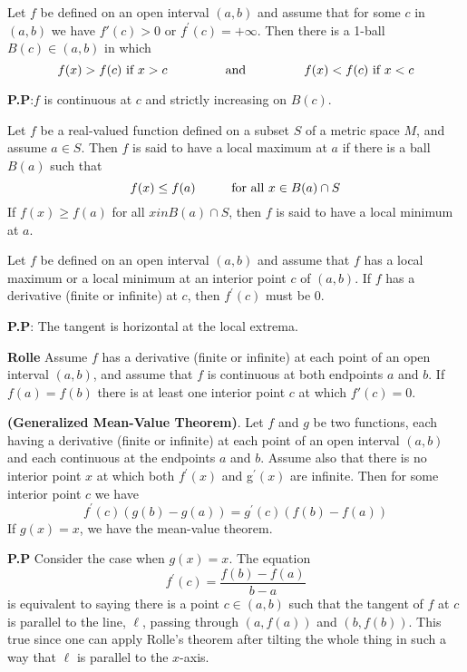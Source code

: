 \documentclass[10pt,a4paper]{book}
\begin{document}
\begin{Thm}
Let $f$ be defined on an open interval $(a, b)$ and assume that for some $c$ in $(a, b)$ we have $f\prime(c) > 0$ or $f^\prime(c) = +\infty$. Then there is a 1-ball $B(c) \in (a,b)$ in which 
$$f(x) > f(c) \text{ if } x > c \hspace*{1.5cm} \text{ and }\hspace*{1.5cm} f(x) < f(c) \text{ if } x < c  $$
\end{Thm}
\noindent \textbf{P.P}:$f$ is continuous at $c$ and strictly increasing on $B(c)$. 


\begin{deff}
Let $f$ be a real-valued function defined on a subset $S$ of a metric space $M$, and assume $a \in S$. Then $f$ is said to have a local maximum at $a$ if there is a ball $B(a)$ such that 
$$f(x)\leq f(a) \hspace*{1cm} \text{for all } x \in B(a)\cap S$$
If $f(x) \geq f(a)$ for all $x in B(a) \cap S$, then $f$ is said to have a local minimum at $a$.
\end{deff}

\begin{Thm}
 Let $f$ be defined on an open interval $(a, b)$ and assume that $f$ has a local maximum or a local minimum at an interior point $c$ of $(a, b)$. If $f$ has a derivative (finite or infinite) at $c$, then $f^\prime(c)$ must be $0$.

\end{Thm}
\noindent \textbf{P.P}: The tangent is horizontal at the local extrema.


\begin{Thm}\textbf{Rolle}
 Assume $f$ has a derivative (finite or infinite) at each point of an open interval $(a, b)$, and assume that $f$ is continuous at both endpoints $a$ and $b$. If $f(a) = f(b)$ there is at least one interior point $c$ at which $f'(c) = 0$.

\end{Thm}
\begin{Thm}
\textbf{(Generalized Mean-Value Theorem)}. Let $f$ and $g$ be two functions, each having a derivative (finite or infinite) at each point of an open interval $(a, b)$ and each continuous at the endpoints $a$ and $b$. Assume also that there is no interior point $x$ at which both $f^\prime(x)$ and g$^\prime(x)$ are infinite. Then for some interior point $c$ we have
        $$f^\prime(c)(g(b) - g(a)) =  g^\prime(c)(f(b) - f(a))$$
If $g(x) = x$, we have the mean-value theorem.
\end{Thm}
\noindent \textbf{P.P} Consider the case when $g(x) = x$. The equation
$$f^\prime(c) =  \dfrac{f(b) - f(a)}{b - a}$$
is equivalent to saying there is a point $c \in (a,b)$ such that the tangent of $f$ at $c$ is parallel to the line, $\ell$, passing through $(a, f(a))$ and $(b,f(b))$. This true since one can apply Rolle's theorem after tilting the whole thing in such a way that $\ell$ is parallel to the $x$-axis.
\end{document}
